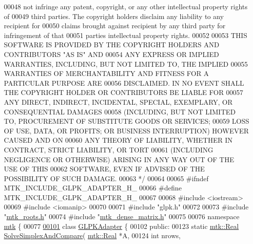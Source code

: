 \begin{DoxyCode}
00048 \textcolor{comment}{not infringe any patent, copyright, or any other intellectual property rights of}
00049 \textcolor{comment}{third parties. The copyright holders disclaim any liability to any recipient for}
00050 \textcolor{comment}{claims brought against recipient by any third party for infringement of that}
00051 \textcolor{comment}{parties intellectual property rights.}
00052 \textcolor{comment}{}
00053 \textcolor{comment}{THIS SOFTWARE IS PROVIDED BY THE COPYRIGHT HOLDERS AND CONTRIBUTORS "AS IS" AND}
00054 \textcolor{comment}{ANY EXPRESS OR IMPLIED WARRANTIES, INCLUDING, BUT NOT LIMITED TO, THE IMPLIED}
00055 \textcolor{comment}{WARRANTIES OF MERCHANTABILITY AND FITNESS FOR A PARTICULAR PURPOSE ARE}
00056 \textcolor{comment}{DISCLAIMED. IN NO EVENT SHALL THE COPYRIGHT HOLDER OR CONTRIBUTORS BE LIABLE FOR}
00057 \textcolor{comment}{ANY DIRECT, INDIRECT, INCIDENTAL, SPECIAL, EXEMPLARY, OR CONSEQUENTIAL DAMAGES}
00058 \textcolor{comment}{(INCLUDING, BUT NOT LIMITED TO, PROCUREMENT OF SUBSTITUTE GOODS OR SERVICES;}
00059 \textcolor{comment}{LOSS OF USE, DATA, OR PROFITS; OR BUSINESS INTERRUPTION) HOWEVER CAUSED AND ON}
00060 \textcolor{comment}{ANY THEORY OF LIABILITY, WHETHER IN CONTRACT, STRICT LIABILITY, OR TORT}
00061 \textcolor{comment}{(INCLUDING NEGLIGENCE OR OTHERWISE) ARISING IN ANY WAY OUT OF THE USE OF THIS}
00062 \textcolor{comment}{SOFTWARE, EVEN IF ADVISED OF THE POSSIBILITY OF SUCH DAMAGE.}
00063 \textcolor{comment}{*/}
00064 
00065 \textcolor{preprocessor}{#ifndef MTK\_INCLUDE\_GLPK\_ADAPTER\_H\_}
00066 \textcolor{preprocessor}{#define MTK\_INCLUDE\_GLPK\_ADAPTER\_H\_}
00067 
00068 \textcolor{preprocessor}{#include <iostream>}
00069 \textcolor{preprocessor}{#include <iomanip>}
00070 
00071 \textcolor{preprocessor}{#include "glpk.h"}
00072 
00073 \textcolor{preprocessor}{#include "\hyperlink{mtk__roots_8h}{mtk\_roots.h}"}
00074 \textcolor{preprocessor}{#include "\hyperlink{mtk__dense__matrix_8h}{mtk\_dense\_matrix.h}"}
00075 
00076 \textcolor{keyword}{namespace }\hyperlink{namespacemtk}{mtk} \{
00077 
\hypertarget{mtk__glpk__adapter_8h_source_l00101}{}\hyperlink{classmtk_1_1GLPKAdapter}{00101} \textcolor{keyword}{class }\hyperlink{classmtk_1_1GLPKAdapter}{GLPKAdapter} \{
00102  \textcolor{keyword}{public}:
00123   \textcolor{keyword}{static} \hyperlink{group__c01-roots_gac080bbbf5cbb5502c9f00405f894857d}{mtk::Real} \hyperlink{classmtk_1_1GLPKAdapter_a834480aca83e3c0d09fdab7fdb7e8a3f}{SolveSimplexAndCompare}(
      \hyperlink{group__c01-roots_gac080bbbf5cbb5502c9f00405f894857d}{mtk::Real} *A,
00124                                           \textcolor{keywordtype}{int} nrows,

\end{DoxyCode}
